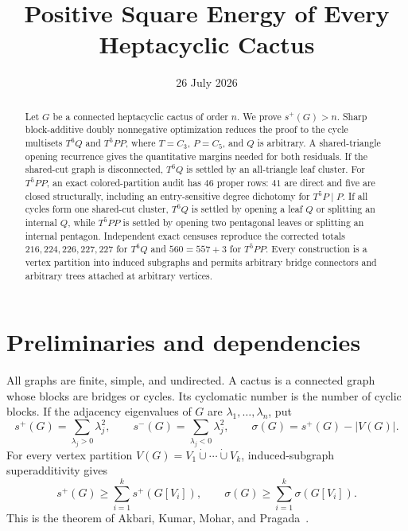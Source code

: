 \documentclass[11pt]{article}
\title{Positive Square Energy of Every Heptacyclic Cactus}
\author{}
\date{26 July 2026}
\newcommand{\spE}{s^+}
\newcommand{\smE}{s^-}
\newcommand{\sig}{\sigma}
\begin{document}
\maketitle

\begin{abstract}
Let $G$ be a connected heptacyclic cactus of order $n$.  We prove
$s^+(G)>n$.  Sharp block-additive doubly nonnegative optimization reduces the
proof to the cycle multisets $T^6Q$ and $T^5PP$, where $T=C_3$, $P=C_5$, and
$Q$ is arbitrary.  A shared-triangle opening recurrence gives the quantitative
margins needed for both residuals.  If the shared-cut graph is disconnected,
$T^6Q$ is settled by an all-triangle leaf cluster.  For $T^5PP$, an exact
colored-partition audit has $46$ proper rows: $41$ are direct and five are
closed structurally, including an entry-sensitive degree dichotomy for
$T^5P\mid P$.  If all cycles form one shared-cut cluster, $T^6Q$ is settled by
opening a leaf $Q$ or splitting an internal $Q$, while $T^5PP$ is settled by
opening two pentagonal leaves or splitting an internal pentagon.  Independent
exact censuses reproduce the corrected totals $216,224,226,227,227$ for
$T^6Q$ and $560=557+3$ for $T^5PP$.  Every construction is a vertex partition
into induced subgraphs and permits arbitrary bridge connectors and arbitrary
trees attached at arbitrary vertices.
\end{abstract}

\section{Preliminaries and dependencies}

All graphs are finite, simple, and undirected.  A cactus is a connected graph
whose blocks are bridges or cycles.  Its cyclomatic number is the number of
cyclic blocks.  If the adjacency eigenvalues of $G$ are
$\lambda_1,\ldots,\lambda_n$, put
\[
 \spE(G)=\sum_{\lambda_j>0}\lambda_j^2,
 \qquad \smE(G)=\sum_{\lambda_j<0}\lambda_j^2,
 \qquad \sig(G)=\spE(G)-|V(G)|.
\]
For every vertex partition
$V(G)=V_1\mathbin{\dot\cup}\cdots\mathbin{\dot\cup}V_k$, induced-subgraph
superadditivity gives
\begin{equation}\label{eq:super}
 \spE(G)\geq\sum_{i=1}^k\spE(G[V_i]),
 \qquad
 \sig(G)\geq\sum_{i=1}^k\sig(G[V_i]).
\end{equation}
This is the theorem of Akbari, Kumar, Mohar, and Pragada~\cite{AKMP}.
\end{document}
